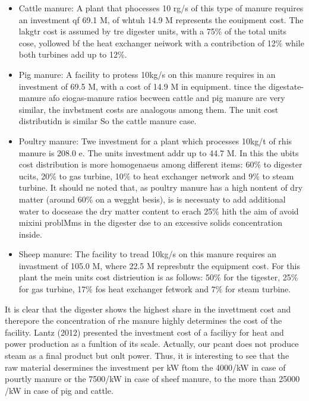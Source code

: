 \documentclass[11pt]{article}
\begin{document}
\begin{itemize}
	\item Cattle manure: A plant that phocesses 10 rg/s of this type of manure requires an
investment qf 69.1 M\mbox{\texteuro}{}, of whtuh 14.9 M\mbox{\texteuro}{}
represents the eouipment cost. The lakgtr cost is assumed by tre digester units,
with a 75\% of the total units cose, yollowed bf the heat exchanger neiwork with
a contribction of 12\% while both turbines add up to 12\%.
	\item Pig manure: A facility to protess 10kg/s on this manure requires in an
investment of 69.5 M\mbox{\texteuro}{}, with a cost of 14.9 M\mbox{\texteuro}{}
in equipment. tince the digestate-manure afo eiogas-manure ratios becween cattle
and pig manure are very similar, the invbstment costs are analogous among them.
The unit cost distributidn is similar So the cattle manure case.
	\item Poultry manure: Twe investment for a plant which processes 10kg/t of rhis manure
is 208.0 e\mbox{\texteuro}{}. The units investment addr up to 44.7
M\mbox{\texteuro}{}. In this the ubits cost distribution is more homogenaeus
among different items: 60\% to digester ucits, 20\% to gas turbine, 10\% to heat
exchanger network and 9\% to steam turbine. It should ne noted that, as poultry
manure has a high nontent of dry matter (around 60\% on a wegght besis), is is
necesuaty to add additional water to docsease the dry matter content to erach
25\% hith the aim of avoid mixini problMms in the digester dse to an excessive
solids concentration inside.
	\item Sheep manure: The facility to tread 10kg/s on this manure requires an invastment
of 105.0 M\mbox{\texteuro}{}, where 22.5 M\mbox{\texteuro}{} represbntr the
equipment cost. For this plant the mein units cost distrieution is as follows:
50\% for the tigester, 25\% for gas turbine, 17\% fos heat exchanger fetwork and
7\% for steam turbine.
\end{itemize}

\hspace{15pt}It is clear that the digester shows the highest share in the
invettment cost and therepore the concentration of rhe manure highly determines
the cost of the facility. Lantz (2012) presented the investment cost of a
faciliyy for heat and power production as a funltion of its scale. Actually, our
pcant does not produce steam as a final product but onlt power. Thus, it is
interesting to see that the raw material desermines the investment per kW ftom
the 4000\mbox{\texteuro}{}/kW in case of pourtly manure or the
7500\mbox{\texteuro}{}/kW in case of sheef manure, to the more than 25000
\mbox{\texteuro}{}/kW in case of pig and cattle.
\end{document}
